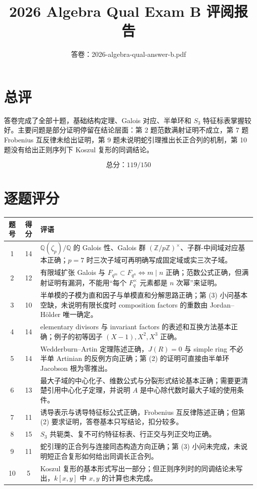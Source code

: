 \documentclass[11pt]{article}
\title{\textbf{2026 Algebra Qual Exam B 评阅报告}}
\author{答卷：2026-algebra-qual-answer-b.pdf}
\date{}
\begin{document}
\maketitle

\section*{总评}

答卷完成了全部十题，基础结构定理、Galois 对应、半单环和 \(S_3\) 特征标表掌握较好。主要问题是部分证明停留在结论层面：第 2 题范数满射证明不成立，第 7 题 Frobenius 互反律未给出证明，第 9 题未说明蛇引理推出长正合列的机制，第 10 题没有给出正则序列下 Koszul 复形的同调结论。

\[
\boxed{\text{总分：}119/150}
\]

\section*{逐题评分}

\begin{longtable}{c c p{10cm}}
\toprule
题号 & 得分 & 评语 \\
\midrule
\endhead
1 & 14 & \(\mathbb Q(\zeta_p)/\mathbb Q\) 的 Galois 性、Galois 群 \((\mathbb Z/p\mathbb Z)^\times\)、子群-中间域对应基本正确；\(p=7\) 时三次子域可再明确写成固定域或实三次子域。\\
2 & 12 & 有限域扩张 Galois 与 \(F_{q^m}\subset F_{q^n}\iff m\mid n\) 正确；范数公式正确，但满射证明有漏洞，不能用“每个 \(F_q^\times\) 元素都是 \(n\) 次幂”来证明。\\
3 & 10 & 半单模的子模为直和因子与单模直和分解思路正确；第 (3) 小问基本空缺，未说明有限长度时 composition factors 的重数由 Jordan--Hölder 唯一确定。\\
4 & 14 & elementary divisors 与 invariant factors 的表述和互换方法基本正确；例子的初等因子 \((X-1),X^2,X^3\) 正确。\\
5 & 14 & Wedderburn--Artin 定理陈述正确，\(J(R)=0\) 与 simple ring 不必半单 Artinian 的反例方向正确；第 (2) 的证明可直接由半单环 Jacobson 根为零推出。\\
6 & 13 & 最大子域的中心化子、维数公式与分裂形式结论基本正确；需要更清楚引用中心化子定理，并说明 \(A\) 是中心除代数时最大子域的使用条件。\\
7 & 11 & 诱导表示与诱导特征标公式正确，Frobenius 互反律陈述正确；但第 (2) 要求证明，答卷基本只写结论，扣分较多。\\
8 & 15 & \(S_3\) 共轭类、复不可约特征标表、行正交与列正交均正确。\\
9 & 11 & 蛇引理的正合列与连接同态构造方向正确；第 (3) 小问未完成，未说明短正合复形如何给出同调长正合列。\\
10 & 5 & Koszul 复形的基本形式写出一部分；但正则序列时的同调结论未写出，\(k[x,y]\) 中 \(x,y\) 的计算也未完成。\\
\bottomrule
\end{longtable}
\end{document}
